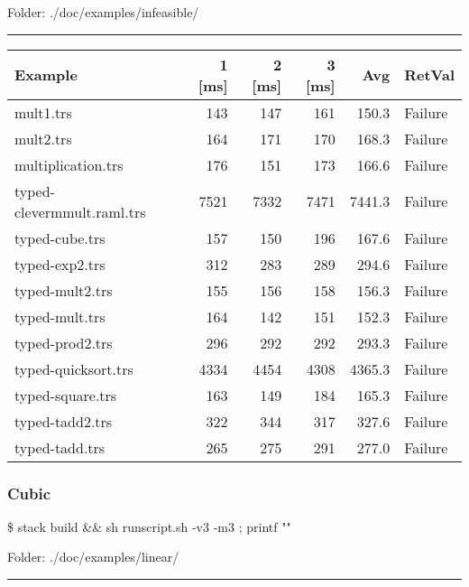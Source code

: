 \documentclass[11pt]{article}
\begin{document}
Folder: ./doc/examples/infeasible/

\rule{\linewidth}{0.5pt}

\begin{center}
\begin{tabular}{lrrrrl}
\hline
Example & 1 [ms] & 2 [ms] & 3 [ms] & Avg & RetVal\\
\hline
mult1.trs & 143 & 147 & 161 & 150.3 & Failure\\
mult2.trs & 164 & 171 & 170 & 168.3 & Failure\\
multiplication.trs & 176 & 151 & 173 & 166.6 & Failure\\
typed-clevermmult.raml.trs & 7521 & 7332 & 7471 & 7441.3 & Failure\\
typed-cube.trs & 157 & 150 & 196 & 167.6 & Failure\\
typed-exp2.trs & 312 & 283 & 289 & 294.6 & Failure\\
typed-mult2.trs & 155 & 156 & 158 & 156.3 & Failure\\
typed-mult.trs & 164 & 142 & 151 & 152.3 & Failure\\
typed-prod2.trs & 296 & 292 & 292 & 293.3 & Failure\\
typed-quicksort.trs & 4334 & 4454 & 4308 & 4365.3 & Failure\\
typed-square.trs & 163 & 149 & 184 & 165.3 & Failure\\
typed-tadd2.trs & 322 & 344 & 317 & 327.6 & Failure\\
typed-tadd.trs & 265 & 275 & 291 & 277.0 & Failure\\
\hline
\end{tabular}

\end{center}

\pagebreak
\subsubsection{Cubic}
\label{sec:org55ce190}

\$ stack build \&\& sh runscript.sh -v3 -m3 ; printf "\a"

Folder: ./doc/examples/linear/

\rule{\linewidth}{0.5pt}
\end{document}
